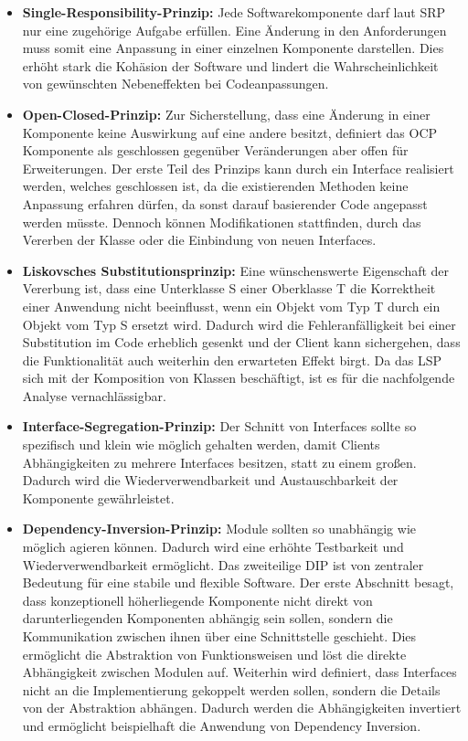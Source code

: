 \begin{itemize}[]
	\item \textbf{Single-Responsibility-Prinzip: } {Jede Softwarekomponente darf laut SRP nur eine zugehörige Aufgabe erfüllen. Eine Änderung in den Anforderungen muss somit eine Anpassung in einer einzelnen Komponente darstellen. Dies erhöht stark die Kohäsion der Software und lindert die Wahrscheinlichkeit von gewünschten Nebeneffekten bei Codeanpassungen.}
	\item \textbf{Open-Closed-Prinzip: } {Zur Sicherstellung, dass eine Änderung in einer Komponente keine Auswirkung auf eine andere besitzt, definiert das OCP Komponente als geschlossen gegenüber Veränderungen aber offen für Erweiterungen. Der erste Teil des Prinzips kann durch ein Interface realisiert werden, welches geschlossen ist, da die existierenden Methoden keine Anpassung erfahren dürfen, da sonst darauf basierender Code angepasst werden müsste. Dennoch können Modifikationen stattfinden, durch das Vererben der Klasse oder die Einbindung von neuen Interfaces.}
	\item \textbf{Liskovsches Substitutionsprinzip: } {Eine wünschenswerte Eigenschaft der Vererbung ist, dass eine Unterklasse S einer Oberklasse T die Korrektheit einer Anwendung nicht beeinflusst, wenn ein Objekt vom Typ T durch ein Objekt vom Typ S ersetzt wird. Dadurch wird die Fehleranfälligkeit bei einer Substitution im Code erheblich gesenkt und der Client kann sichergehen, dass die Funktionalität auch weiterhin den erwarteten Effekt birgt. Da das LSP sich mit der Komposition von Klassen beschäftigt, ist es für die nachfolgende Analyse vernachlässigbar.}
	\item \textbf{Interface-Segregation-Prinzip: } {Der Schnitt von Interfaces sollte so spezifisch und klein wie möglich gehalten werden, damit Clients Abhängigkeiten zu mehrere Interfaces besitzen, statt zu einem großen. Dadurch wird die Wiederverwendbarkeit und Austauschbarkeit der Komponente gewährleistet.}
	\item \textbf{Dependency-Inversion-Prinzip: } {Module sollten so unabhängig wie möglich agieren können. Dadurch wird eine erhöhte Testbarkeit und Wiederverwendbarkeit ermöglicht. Das zweiteilige DIP ist von zentraler Bedeutung für eine stabile und flexible Software. Der erste Abschnitt besagt, dass konzeptionell höherliegende Komponente nicht direkt von darunterliegenden Komponenten abhängig sein sollen, sondern die Kommunikation zwischen ihnen über eine Schnittstelle geschieht. Dies ermöglicht die Abstraktion von Funktionsweisen und löst die direkte Abhängigkeit zwischen Modulen auf. Weiterhin wird definiert, dass Interfaces nicht an die Implementierung gekoppelt werden sollen, sondern die Details von der Abstraktion abhängen. Dadurch werden die Abhängigkeiten invertiert und ermöglicht beispielhaft die Anwendung von Dependency Inversion.}
\end{itemize}

